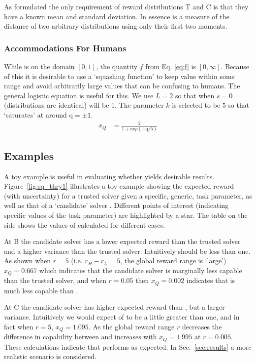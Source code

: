 As formulated the only requirement of reward distributions T and C is that they have a known mean and standard deviation. In essence \xQ{} is a measure of the distance of two arbitrary distributions using only their first two moments.

\subsubsection{Accommodations For Humans}
While \hell{} is on the domain $[0,1]$, the quantity $f$ from Eq. \ref{eq:f} is $[0,\infty]$. Because of this it is desirable to use a `squashing function' to keep \xQ{} value within some range and avoid arbitrarily large values that can be confusing to humans. The general logistic equation is useful for this.
We use $L=2$ so that when $s=0$ (distributions are identical) \xQ{} will be 1. The parameter $k$ is selected to be $5$ so that \xQ{} `saturates' at around $\text{q}=\pm1$.
\begin{align}
    x_{Q} &= \frac{2}{1+exp(-\text{q}/5)}\label{eq:SQ}
\end{align}

\subsection{Examples}
A toy example is useful in evaluating whether \xQ{} yields desirable results. Figure~\ref{fig:sq_thry1} illustrates a toy example showing the expected reward (with uncertainty) for a trusted solver \solvestar{} given a specific, generic, task parameter, as well as that of a `candidate' solver \solve. Different points of interest (indicating specific values of the task parameter) are highlighted by a star. The table on the side shows the values of \xQ{} calculated for different cases.

At B the candidate solver has a lower expected reward than the trusted solver and a higher variance than the trusted solver. Intuitively \xQ{} should be less than one. As shown when $r=5$ (i.e. $r_H-r_L=5$, the global reward range is `large') $x_Q=0.667$ which indicates that the candidate solver is marginally less capable than the trusted solver, and when $r=0.05$ then $x_Q=0.002$ indicates that \solve{} is much less capable than \solvestar.

At C the candidate solver \solve{} has higher expected reward than \solvestar, but a larger variance. Intuitively we would expect \xQ{} of \solve{} to be a little greater than one, and in fact when $r=5$, $x_Q=1.095$. As the global reward range $r$ decreases the difference in capability between \solve{} and \solvestar{} increases with $x_Q=1.995$ at $r=0.005$. These calculations indicate that \xQ{} performs as expected. In Sec.~\ref{sec:results} a more realistic scenario is considered. 

